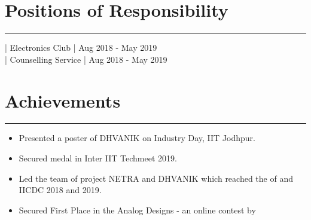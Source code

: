 \documentclass[]{resume}
\begin{document}
\begin{minipage}[t]{0.69\textwidth}
\section{Positions of Responsibility}
\vspace{-0.5em}
\noindent\rule{13cm}{0.4pt}

| Electronics Club  | Aug 2018 - May 2019\\
 | Counselling Service | Aug 2018 - May 2019\\
\vspace{-0.7em}
\section{Achievements}
\vspace{-0.5em}
\noindent\rule{13cm}{0.4pt}

\vspace{-0.9em}
\begin{itemize}
  \item Presented a poster of DHVANIK on Industry Day, IIT Jodhpur.  
  \vspace{-0.6em}
  \item Secured  medal in Inter IIT Techmeet 2019.
  \vspace{-0.6em}
  \item Led the team of project NETRA and DHVANIK which reached the  of  and  IICDC 2018 and 2019.
  \vspace{-0.6em}
  \item Secured First Place in the Analog Designs - an online contest by 
\end{itemize}

\end{minipage} 
\end{document}
